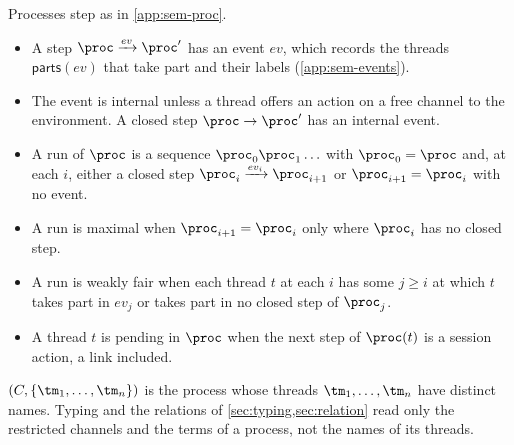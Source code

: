 \begin{definition}
\label{def:runs}
Processes step as in \cref{app:sem-proc}.
\begin{itemize}
  \item A step $\proc \xrightarrow{ev} \proc'$ has an event $ev$, which records the threads $\mathsf{parts}(ev)$ that take part and their labels (\cref{app:sem-events}).
  \item The event is internal unless a thread offers an action on a free channel to the environment. A closed step $\proc \to \proc'$ has an internal event.
  \item A run of $\proc$ is a sequence $\proc_0 \proc_1 \ldots$ with $\proc_0 = \proc$ and, at each $i$, either a closed step $\proc_i \xrightarrow{ev_i} \proc_{i+1}$ or $\proc_{i+1} = \proc_i$ with no event.
  \item A run is maximal when $\proc_{i+1} = \proc_i$ only where $\proc_i$ has no closed step.
  \item A run is weakly fair when each thread $t$ at each $i$ has some $j \geq i$ at which $t$ takes part in $ev_j$ or takes part in no closed step of $\proc_j$.
  \item A thread $t$ is pending in $\proc$ when the next step of $\proc(t)$ is a session action, a link included.
\end{itemize}
$(C, \{\tm_1, \ldots, \tm_n\})$ is the process whose threads $\tm_1, \ldots, \tm_n$ have distinct names. Typing and the relations of \cref{sec:typing,sec:relation} read only the restricted channels and the terms of a process, not the names of its threads.
\end{definition}

